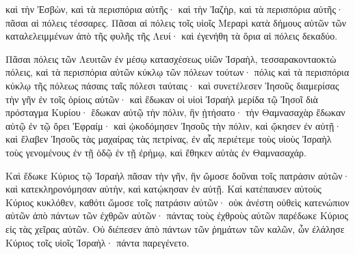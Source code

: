 {καὶ τὴν Ἐσβὼν, καὶ τὰ περισπόρια αὐτῆς· καὶ τὴν Ἰαζὴρ, καὶ τὰ περισπόρια αὐτῆς· πᾶσαι αἱ πόλεις τέσσαρες.
Πᾶσαι αἱ πόλεις τοῖς υἱοῖς Μεραρὶ κατὰ δήμους αὐτῶν τῶν καταλελειμμένων ἀπὸ τῆς φυλῆς τῆς Λευί· καὶ ἐγενήθη τὰ ὅρια αἱ πόλεις δεκαδύο.
\par }{\PP {}Πᾶσαι πόλεις τῶν Λευιτῶν ἐν μέσῳ κατασχέσεως υἱῶν Ἰσραὴλ, τεσσαρακονταοκτὼ πόλεις, καὶ τὰ περισπόρια αὐτῶν
κύκλῳ τῶν πόλεων τούτων· πόλις καὶ τὰ περισπόρια κύκλῳ τῆς πόλεως πάσαις ταῖς πόλεσι ταύταις·
καὶ συνετέλεσεν Ἰησοῦς διαμερίσας τὴν γῆν ἐν τοῖς ὁρίοις αὐτῶν·
καὶ ἔδωκαν οἱ υἱοὶ Ἰσραὴλ μερίδα τῷ Ἰησοῖ διὰ πρόσταγμα Κυρίου· ἔδωκαν αὐτῷ τὴν πόλιν, ἣν ᾐτήσατο· τὴν Θαμνασαχὰρ ἔδωκαν αὐτῷ ἐν τῷ ὄρει Ἐφραίμ·
καὶ ᾠκοδόμησεν Ἰησοῦς τὴν πόλιν, καὶ ᾤκησεν ἐν αὐτῇ·
καὶ ἔλαβεν Ἰησοῦς τὰς μαχαίρας τὰς πετρίνας, ἐν αἷς περιέτεμε τοὺς υἱοὺς Ἰσραὴλ τοὺς γενομένους ἐν τῇ ὁδῷ ἐν τῇ ἐρήμῳ, καὶ ἔθηκεν αὐτὰς ἐν Θαμνασαχάρ.
\par }{\PP {}Καὶ ἔδωκε Κύριος τῷ Ἰσραὴλ πᾶσαν τὴν γῆν, ἣν ὤμοσε δοῦναι τοῖς πατράσιν αὐτῶν· καὶ κατεκληρονόμησαν αὐτὴν, καὶ κατῴκησαν ἐν αὐτῇ.
Καὶ κατέπαυσεν αὐτοὺς Κύριος κυκλόθεν, καθότι ὤμοσε τοῖς πατράσιν αὐτῶν· οὐκ ἀνέστη οὐθεὶς κατενώπιον αὐτῶν ἀπὸ πάντων τῶν ἐχθρῶν αὐτῶν· πάντας τοὺς ἐχθροὺς αὐτῶν παρέδωκε Κύριος εἰς τὰς χεῖρας αὐτῶν.
Οὐ διέπεσεν ἀπὸ πάντων τῶν ῥημάτων τῶν καλῶν, ὧν ἐλάλησε Κύριος τοῖς υἱοῖς Ἰσραὴλ· πάντα παρεγένετο.

}
